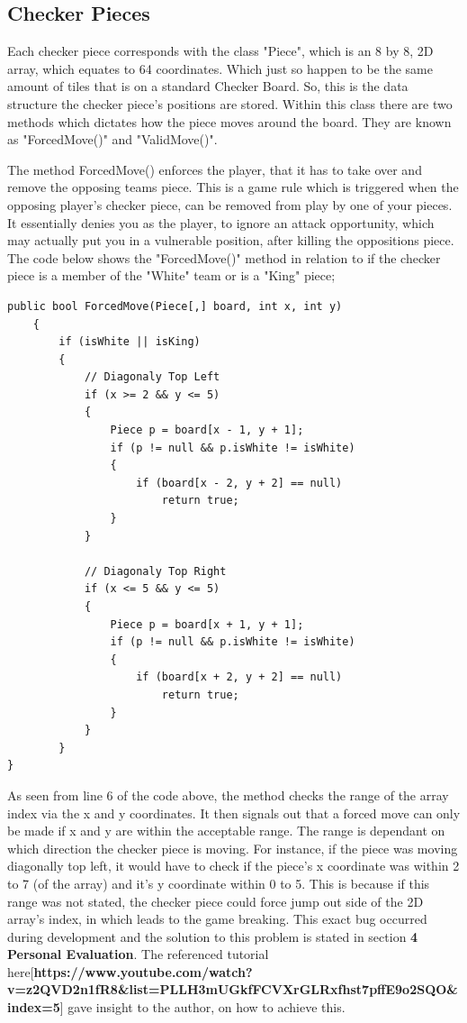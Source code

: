 \documentclass[10pt, a4paper]{article}
\begin{document}
	\subsection{Checker Pieces}
	Each checker piece corresponds with the class "Piece", which is an 8 by 8, 2D array, which equates to 64 coordinates. Which just so happen to be the same amount of tiles that is on a standard Checker Board. So, this is the data structure the checker piece's positions are stored. Within this class there are two methods which dictates how the piece moves around the board. They are known as "ForcedMove()" and "ValidMove()".
	
	The method ForcedMove() enforces the player, that it has to take over and remove the opposing teams piece. This is a game rule which is triggered when the opposing player's checker piece, can be removed from play by one of your pieces. It essentially denies you as the player, to ignore an attack opportunity, which may actually put you in a vulnerable position, after killing the oppositions piece. The code below shows the "ForcedMove()" method in relation to if the checker piece is a member of the "White" team or is a "King" piece;
	\begin{lstlisting}[caption = ForcedMove()]
public bool ForcedMove(Piece[,] board, int x, int y)
    {
        if (isWhite || isKing)
        {
            // Diagonaly Top Left
            if (x >= 2 && y <= 5)
            {
                Piece p = board[x - 1, y + 1];
                if (p != null && p.isWhite != isWhite)
                {
                    if (board[x - 2, y + 2] == null)
                        return true;
                }
            }
            
            // Diagonaly Top Right
            if (x <= 5 && y <= 5)
            {
                Piece p = board[x + 1, y + 1];
                if (p != null && p.isWhite != isWhite)
                {
                    if (board[x + 2, y + 2] == null)
                        return true;
                }
            }
        }
}
	\end{lstlisting}
	
	As seen from line 6 of the code above, the method checks the range of the array index via the x and y coordinates. It then signals out that a forced move can only be made if x and y are within the acceptable range. The range is dependant on which direction the checker piece is moving. For instance, if the piece was moving diagonally top left, it would have to check if the piece's x coordinate was within 2 to 7 (of the array) and it's y coordinate within 0 to 5. This is because if this range was not stated, the checker piece could force jump out side of the 2D array's index, in which leads to the game breaking. This exact bug occurred during development and the solution to this problem is stated in section \textbf{4 Personal Evaluation}. The referenced tutorial here[\textbf{https://www.youtube.com/watch?v=z2QVD2n1fR8&list=PLLH3mUGkfFCVXrGLRxfhst7pffE9o2SQO&index=5}] gave insight to the author, on how to achieve this.
	
\end{document}

